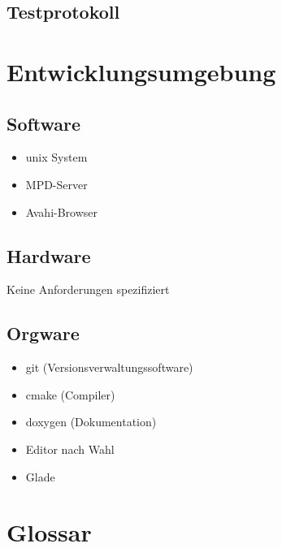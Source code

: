\subsection{Testprotokoll}
\section{Entwicklungsumgebung}
\subsection{Software}
\begin{itemize}
	\item unix System
	\item MPD-Server	
	\item Avahi-Browser
\end{itemize}
\subsection{Hardware}
Keine Anforderungen spezifiziert
\subsection{Orgware}
\begin{itemize}
	\item git (Versionsverwaltungssoftware)
	\item cmake (Compiler)
	\item doxygen (Dokumentation)
	\item Editor nach Wahl
	\item Glade
\end{itemize}
\section{Glossar}
